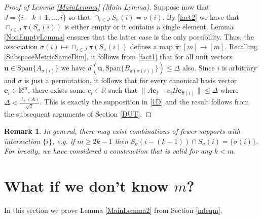 \documentclass[journal, onecolumn]{IEEEtran}
\newtheorem{remark}{Remark}
\begin{document}
\begin{proof}[Proof of Lemma \ref{MainLemma} (Main Lemma)]
Suppose now that $J = \{i-k+1, \ldots, i\}$ so that $\cap_{i \in J} S_\sigma(i) = \sigma(i)$. By \eqref{fact2} we have that $\cap_{i \in J} \pi(S_\sigma(i))$ is either empty or it contains a single element. Lemma \ref{NonEmptyLemma} ensures that the latter case is the only possibility. Thus, the association $\sigma(i) \mapsto \cap_{i \in J} \pi(S_\sigma(i))$ defines a map $\hat \pi: [m] \to [m]$. Recalling \eqref{SubspaceMetricSameDim}, it follows from \eqref{fact1} that for all unit vectors $\mathbf{u} \in \text{Span}\{A_{\sigma(i)}\}$ we have $d\left( \mathbf{u}, \text{Span}\{B_{\hat \pi(\sigma(i))}\}\right) \leq \Delta$ also. Since $i$ is arbitrary and $\sigma$ is just a permutation, it follows that for every canonical basis vector $\mathbf{e}_i \in \mathbb{R}^m$, there exists some $c_i \in \mathbb{R}$ such that $\|A\mathbf{e}_i - c_iB\mathbf{e}_{\hat \pi(i)}\| \leq \Delta$ where $\Delta < \frac{\ell_2(A)}{\sqrt{2}}$. This is exactly the supposition in \eqref{1D} and the result follows from the subsequent arguments of Section \ref{DUT}. 
\end{proof}

\begin{remark} In general, there may exist combinations of fewer supports with intersection $\{i\}$, e.g. if $m \geq 2k-1$ then $S_\sigma(i - (k-1)) \cap S_\sigma(i) = \{\sigma(i)\}$. For brevity, we have considered a construction that is valid for any $k < m$.
\end{remark}


\section{What if we don't know $m$?}\label{mleqmAppendix}

In this section we prove Lemma \ref{MainLemma2} from Section \ref{mleqm}.

\end{document}
